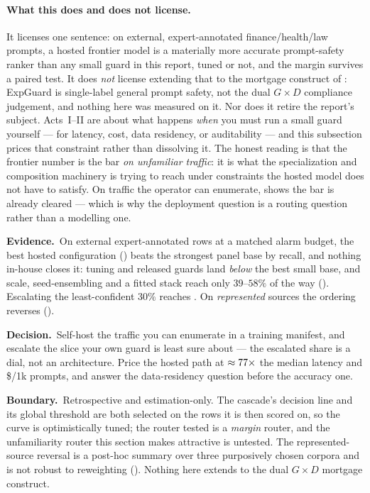 \documentclass[11pt]{article}
\newcommand{\edb}[3]{\begin{edbox}\textbf{\textcolor{tkgreenedge}{Evidence.}}~#1\par\smallskip
  \textbf{\textcolor{bgblueedge}{Decision.}}~#2\par\smallskip
  \textbf{\textcolor{amberedge}{Boundary.}}~#3\end{edbox}}
\begin{document}
\paragraph{What this does and does not license.} It licenses one sentence: on external,
expert-annotated finance/health/law prompts, a hosted frontier model is a materially more
accurate prompt-safety ranker than any small guard in this report, tuned or not, and the margin
survives a paired test. It does \emph{not} license extending that to the mortgage construct of
: ExpGuard is single-label general prompt safety, not the dual
$G\times D$ compliance judgement, and nothing here was measured on it. Nor does it retire the
report's subject. Acts~I--II are about what happens \emph{when} you must run a small guard
yourself --- for latency, cost, data residency, or auditability --- and this subsection prices
that constraint rather than dissolving it. The honest reading is that the frontier number is the
bar \emph{on unfamiliar traffic}: it is what the specialization and composition machinery is
trying to reach under constraints the hosted model does not have to satisfy. On traffic the
operator can enumerate,  shows the bar is already cleared --- which is
why the deployment question is a routing question rather than a modelling one.

\edb{On external expert-annotated rows at a matched \HtwoBudget{} alarm budget, the best hosted
configuration (\FrontierBestName) beats the strongest panel base by \FrontierGainOverBase{}
\FrontierGainOverBaseCI{} recall, and nothing in-house closes it: tuning and released guards land
\emph{below} the best small base, and scale, seed-ensembling and a fitted stack reach only
$39$--$58\%$ of the way (\Cref{fig:gap-ladder}). Escalating the least-confident $30\%$ reaches
\CascadeThirty{}. On \emph{represented} sources the ordering reverses (\Cref{fig:regime-map}).}
{Self-host the traffic you can enumerate in a training manifest, and escalate the slice your own
guard is least sure about --- the escalated share is a dial, not an architecture. Price the hosted
path at $\approx77\times$ the median latency and \$\FrontierBestCost/1k prompts, and
answer the data-residency question before the accuracy one.}
{Retrospective and estimation-only. The cascade's decision line and its global \HtwoBudget{} threshold
are both selected on the rows it is then scored on, so the curve is optimistically tuned; the router
tested is a \emph{margin} router, and the unfamiliarity router this section makes attractive is
untested. The represented-source reversal is a post-hoc summary over three purposively chosen corpora
and is not robust to reweighting (\Cref{tab:h2h-weighting}). Nothing here extends to the dual
$G\times D$ mortgage construct.}
\end{document}
